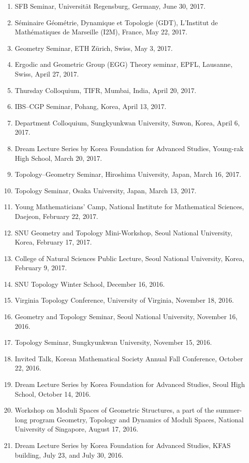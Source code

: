 \documentclass[11pt,a4paper]{article}
\begin{document}
\begin{enumerate}[leftmargin=1.5em, label=\arabic*.]
\item SFB Seminar, Universität Regensburg, Germany, June 30, 2017.
\item Séminaire Géométrie, Dynamique et Topologie (GDT), L’Institut de Mathématiques de Marseille (I2M), France, May 22, 2017.
\item Geometry Seminar, ETH Zürich, Swiss, May 3, 2017.
\item Ergodic and Geometric Group (EGG) Theory seminar, EPFL, Lausanne, Swiss, April 27, 2017.
\item Thursday Colloquium, TIFR, Mumbai, India, April 20, 2017.
\item IBS--CGP Seminar, Pohang, Korea, April 13, 2017.
\item Department Colloquium, Sungkyunkwan University, Suwon, Korea, April 6, 2017.
\item Dream Lecture Series by Korea Foundation for Advanced Studies, Young-rak High School, March 20, 2017.
\item Topology--Geometry Seminar, Hiroshima University, Japan, March 16, 2017.
\item Topology Seminar, Osaka University, Japan, March 13, 2017.
\item Young Mathematicians' Camp, National Institute for Mathematical Sciences, Daejeon, February 22, 2017.
\item SNU Geometry and Topology Mini-Workshop, Seoul National University, Korea, February 17, 2017.
\item College of Natural Sciences Public Lecture, Seoul National University, Korea, February 9, 2017.
\item SNU Topology Winter School, December 16, 2016.
\item Virginia Topology Conference, University of Virginia, November 18, 2016.
\item Geometry and Topology Seminar, Seoul National University, November 16, 2016.
\item Topology Seminar, Sungkyunkwan University, November 15, 2016.
\item Invited Talk, Korean Mathematical Society Annual Fall Conference, October 22, 2016.
\item Dream Lecture Series by Korea Foundation for Advanced Studies, Seoul High School, October 14, 2016.
\item Workshop on Moduli Spaces of Geometric Structures, a part of the summer-long program Geometry, Topology and Dynamics of Moduli Spaces, National University of Singapore, August 17, 2016.
\item Dream Lecture Series by Korea Foundation for Advanced Studies, KFAS building, July 23, and July 30, 2016.

\end{enumerate}
\end{document}

